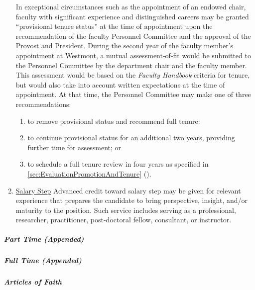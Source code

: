 \begin{enumerate}[label=\alph*)]
{						In exceptional circumstances such as the appointment of an
						endowed chair, faculty with significant experience and
						distinguished careers may be granted ``provisional tenure
						status'' at the time of appointment upon the recommendation of
						the faculty Personnel Committee and the approval of the Provost
						and President.  During the second year of the faculty member's
						appointment at Westmont, a mutual assessment-of-fit would be
						submitted to the Personnel Committee by the department chair and
						the faculty member.  This assessment would be based on the
						\emph{Faculty Handbook} criteria for tenure, but would also take
						into account written expectations at the time of appointment.
						At that time, the Personnel Committee may make one of three
						recommendations:
						\begin{enumerate}[label=(\arabic*)]
							\item{to remove provisional status and recommend
								full tenure:}
							\item{to continue provisional status for an
								additional two years, providing further time for assessment; or}
							\item{
								to schedule a full tenure review in four years as specified
								in
								\ref{sec:EvaluationPromotionAndTenure}
								().}
						\end{enumerate}
					}

					\item{\underline{Salary Step} Advanced credit toward salary
						step may be given for relevant experience that prepares the
						candidate to bring perspective, insight, and/or maturity to
						the position.  Such service includes serving as a
						professional, researcher, practitioner, post-doctoral
						fellow, consultant, or instructor.}

				\end{enumerate}
				\subparagraph{Part Time (Appended)}
				\subparagraph{Full Time (Appended)}
				\subparagraph{Articles of Faith}
					\label{sec:ArticlesOfFaith}
